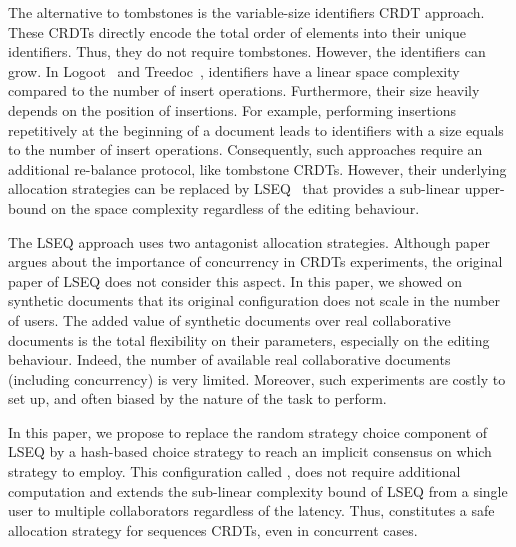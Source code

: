 The alternative to tombstones is the variable-size identifiers CRDT
approach. These CRDTs directly encode the total order of elements into their
unique identifiers. Thus, they do not require tombstones. However, the
identifiers can grow. In Logoot~\cite{weiss2009logoot} and
Treedoc~\cite{preguica2009commutative}, identifiers have a linear space
complexity compared to the number of insert operations. Furthermore, their size
heavily depends on the position of insertions. For example, performing
insertions repetitively at the beginning of a document leads to identifiers
with a size equals to the number of insert operations. Consequently, such
approaches require an additional re-balance protocol, like tombstone CRDTs.
However, their underlying allocation strategies can be replaced by
LSEQ~\cite{nedelec2013lseq} that provides a sub-linear upper-bound on the space
complexity regardless of the editing behaviour.

The LSEQ approach uses two antagonist allocation strategies. Although
paper~\cite{ahmed2011evaluating} argues about the importance of concurrency in
CRDTs experiments, the original paper of LSEQ does not consider this aspect. In
this paper, we showed on synthetic documents that its original configuration
does not scale in the number of users. The added value of synthetic documents
over real collaborative documents is the total flexibility on their parameters,
especially on the editing behaviour. Indeed, the number of available real
collaborative documents (including concurrency) is very limited. Moreover, such
experiments are costly to set up, and often biased by the nature of the task to
perform.


In this paper, we propose to replace the random strategy choice component of
LSEQ by a hash-based choice strategy to reach an implicit consensus on which
strategy to employ. This configuration called \NAME{}, does not require
additional computation and extends the sub-linear complexity bound of LSEQ from
a single user to multiple collaborators regardless of the latency. Thus,
\NAME{} constitutes a safe allocation strategy for sequences CRDTs, even in
concurrent cases.


